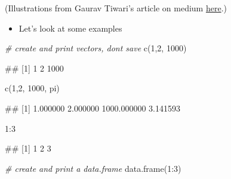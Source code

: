 \documentclass[
]{book}
\newenvironment{Shaded}{\begin{snugshade}}{\end{snugshade}}
\newcommand{\CommentTok}[1]{\textcolor[rgb]{0.56,0.35,0.01}{\textit{#1}}}
\newcommand{\DecValTok}[1]{\textcolor[rgb]{0.00,0.00,0.81}{#1}}
\newcommand{\FunctionTok}[1]{\textcolor[rgb]{0.00,0.00,0.00}{#1}}
\newcommand{\NormalTok}[1]{#1}
\newcommand{\SpecialCharTok}[1]{\textcolor[rgb]{0.00,0.00,0.00}{#1}}
\providecommand{\tightlist}{%
  \setlength{\itemsep}{0pt}\setlength{\parskip}{0pt}}
\begin{document}
(Illustrations from Gaurav Tiwari's article on medium \href{https://medium.com/@tiwarigaurav2512/r-data-types-847fffb01d5b}{here}.)

\begin{itemize}
\tightlist
\item
  Let's look at some examples
\end{itemize}

\begin{Shaded}
\begin{Highlighting}[]
\CommentTok{\# create and print vectors, don\textquotesingle{}t save}
\FunctionTok{c}\NormalTok{(}\DecValTok{1}\NormalTok{,}\DecValTok{2}\NormalTok{, }\DecValTok{1000}\NormalTok{)}
\end{Highlighting}
\end{Shaded}

\begin{Shaded}
\begin{Highlighting}[]
\NormalTok{\#\# [1]    1    2 1000}
\end{Highlighting}
\end{Shaded}

\begin{Shaded}
\begin{Highlighting}[]
\FunctionTok{c}\NormalTok{(}\DecValTok{1}\NormalTok{,}\DecValTok{2}\NormalTok{, }\DecValTok{1000}\NormalTok{, pi)}
\end{Highlighting}
\end{Shaded}

\begin{Shaded}
\begin{Highlighting}[]
\NormalTok{\#\# [1]    1.000000    2.000000 1000.000000    3.141593}
\end{Highlighting}
\end{Shaded}

\begin{Shaded}
\begin{Highlighting}[]
\DecValTok{1}\SpecialCharTok{:}\DecValTok{3}
\end{Highlighting}
\end{Shaded}

\begin{Shaded}
\begin{Highlighting}[]
\NormalTok{\#\# [1] 1 2 3}
\end{Highlighting}
\end{Shaded}

\begin{Shaded}
\begin{Highlighting}[]
\CommentTok{\# create and print a data.frame}
\FunctionTok{data.frame}\NormalTok{(}\DecValTok{1}\SpecialCharTok{:}\DecValTok{3}\NormalTok{)}
\end{Highlighting}
\end{Shaded}
\end{document}
